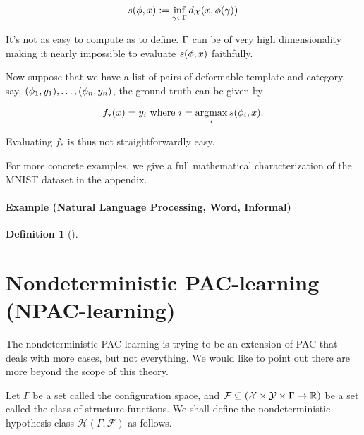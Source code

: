 \documentclass[11pt, oneside]{article}   	%
\theoremstyle{definition}
\newtheorem*{defn}{Definition}
\begin{document}
\[ s(\phi, x) := \inf_{\gamma \in \Gamma} d_{\mathcal{X}} (x, \phi(\gamma)) \]

It's not as easy to compute as to define. $\Gamma$ can be of very high dimensionality making it nearly impossible to evaluate $s(\phi, x)$ faithfully.

Now suppose that we have a list of pairs of deformable template and category, say, $(\phi_1, y_1), \dots, (\phi_n, y_n)$, the ground truth can be given by

\[ f_*(x) = y_i \text{ where } i = \mathop{\operatorname{argmax}}_i s(\phi_i, x) . \]

Evaluating $f_*$ is thus not straightforwardly easy.

For more concrete examples, we give a full mathematical characterization of the MNIST dataset in the appendix.

\paragraph{Example (Natural Language Processing, Word, Informal)}


\begin{defn}[]
	
\end{defn}

\section{Nondeterministic PAC-learning (NPAC-learning)}

The nondeterministic PAC-learning is trying to be an extension of PAC that deals with more cases, but not everything. We would like to point out there are more beyond the scope of this theory.

\newcommand{\Weight}{W}

\newcommand{\Configuration}{\Gamma}
\newcommand{\NondeterministicHypothesisClass}{\mathcal{H}(\Gamma,\mathcal{F})}
\newcommand{\StructureFunctionClass}{\mathcal{F}}

Let $\Configuration$ be a set called the configuration space, and $\StructureFunctionClass\subseteq(\Input\times \Output\times \Configuration \to \mathbb{R})$ be a set called the class of structure functions. We shall define the nondeterministic hypothesis class $\NondeterministicHypothesisClass$ as follows.
\end{document}
